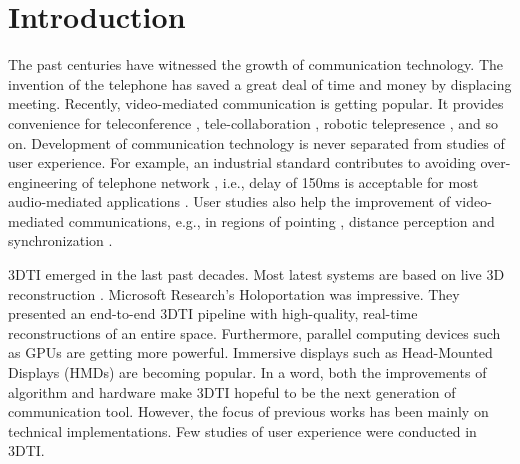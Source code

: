 \section{Introduction}


The past centuries have witnessed the growth of communication technology. The invention of the telephone has saved a great deal of time and money by displacing meeting. Recently, video-mediated communication is getting popular. It provides convenience for teleconference \cite{marlow2016beyond}, tele-collaboration \cite{donovan2014understanding, avellino2015accuracy}, robotic telepresence \cite{jouppi2001robotic, misawa2015chameleonmask, neustaedter2016beam}, and so on. Development of communication technology is never separated from studies of user experience. For example, an industrial standard contributes to avoiding over-engineering of telephone network \cite{itu2003recommendation}, i.e., delay of 150ms is acceptable for most audio-mediated applications \cite{recommendation2003114, donovan2014understanding}. User studies also help the improvement of video-mediated communications, e.g., in regions of pointing \cite{higuchi2015immerseboard, avellino2015accuracy}, distance perception \cite{boustila2015evaluation, alexandrova2010egocentric} and synchronization \cite{geerts2011we, tam2012video, schmitt2014influence}.

3DTI emerged in the last past decades. Most latest systems are based on live 3D reconstruction \cite{kurillo2008immersive, petit2010multicamera, maimone2011encumbrance, maimone2012real}. Microsoft Research's Holoportation \cite{orts2016holoportation} was impressive. They presented an end-to-end 3DTI pipeline with high-quality, real-time reconstructions of an entire space. Furthermore, parallel computing devices such as GPUs are getting more powerful. Immersive displays such as Head-Mounted Displays (HMDs) are becoming popular. In a word, both the improvements of algorithm and hardware make 3DTI hopeful to be the next generation of communication tool. However, the focus of previous works has been mainly on technical implementations. Few studies of user experience were conducted in 3DTI.



